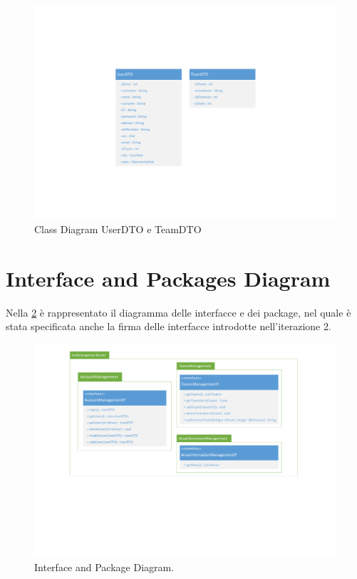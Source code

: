 \begin{figure}[h!]
	\centering
	\includegraphics[width=1\linewidth]{./Iterazione 3/OtherFiles/DTOSpecification}
	\caption{Class Diagram UserDTO e TeamDTO}
	\label{fig:ClassDiagramDTO_iterazione2}
\end{figure}

\clearpage

\section{Interface and Packages Diagram}
Nella \Fig\ref{fig:InterfaceDiagram_iterazione2} è rappresentato il diagramma delle interfacce e dei package, nel quale è stata specificata anche la firma delle interfacce introdotte nell'iterazione 2.

\begin{figure}[h]
	\centering
	\includegraphics[width=1\linewidth]{./Iterazione 2/OtherFiles/UML - Interface Diagram}
	\caption{Interface and Package Diagram.}
	\label{fig:InterfaceDiagram_iterazione2}
\end{figure}
